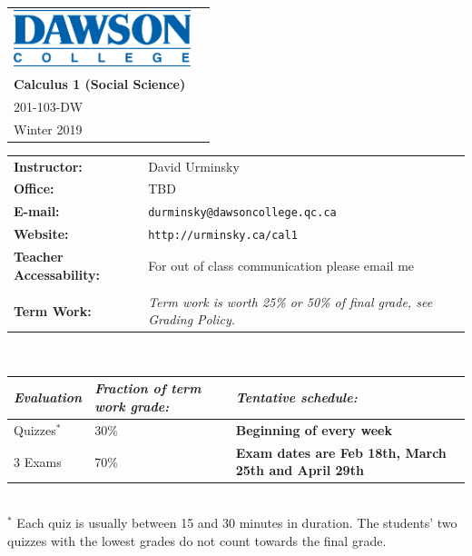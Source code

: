 \documentclass[12pt]{article}
\begin{document}
\begin{tabular*}{8in}{@{}p{4.75in}r}
\includegraphics[height=0.65in]{dawson-college-blue.png} &
\raisebox{0.5cm}{
\begin{tabular}{r}
\large\textbf{Mathematics Department}\\
\large\textbf{Calculus 1 {\sc (Social Science)}}\\
\large 201-103-DW \\
\large Winter 2019
\end{tabular}}
\end{tabular*}

\vspace{0.5in}

\normalsize
\begin{tabular}{@{}p{2in}p{5.25in}}
\textbf{Instructor:} & David Urminsky\\
\textbf{Office:} & TBD\\
\textbf{E-mail:} & \verb+durminsky@dawsoncollege.qc.ca+\\
\textbf{Website:} & \verb+http://urminsky.ca/cal1+\\
\textbf{Teacher Accessability:} & For out of class communication please email me\\\\
\textbf{Term Work:}&\textit{Term work is worth 25\% or 50\% of final grade, see Grading Policy.}\\
\end{tabular}\\
\begin{tabular}{l|p{2in}|p{4.15in}}
\textit{Evaluation} & \textit{Fraction of term work grade:} & \textit{Tentative schedule:}\\
\hline
Quizzes$^{*}$ & 30\% & \textbf{Beginning of every week}\\
3 Exams & 70\% & \textbf{Exam dates are Feb 18th, March 25th and April 29th}\\
\end{tabular}\\
$^{*}$ Each quiz is usually between 15 and 30 minutes in duration. The students' two quizzes with the lowest grades do
not count towards the final grade.\\
\end{document}
